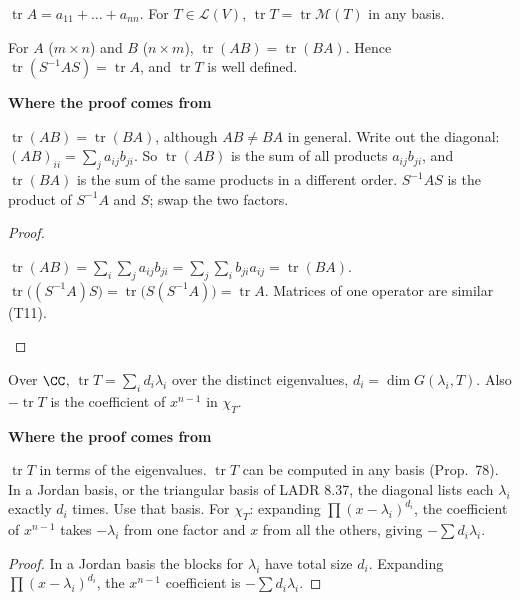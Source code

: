 \documentclass[10pt]{scrartcl}
\DeclareMathOperator{\tr}{tr}
\newcommand{\LL}{\mathcal L}
\newcommand{\MM}{\mathcal M}
\newenvironment{motive}{\begin{mdframed}[style=thinkbox]\textbf{\color{OliveGreen!75!black}Where the proof comes from}\begin{description}[leftmargin=0.9em,labelindent=0pt,itemsep=2pt,topsep=2pt,font=\normalfont\bfseries\color{OliveGreen!70!black}]}{\end{description}\end{mdframed}}
\newenvironment{steps}{\begin{enumerate}[label=\arabic*.,leftmargin=1.5em,itemsep=2pt,topsep=2pt]}{\end{enumerate}}
\begin{document}
\begin{definition*}
  $\tr A=a_{11}+\dots+a_{nn}$. For $T\in\LL(V)$, $\tr T=\tr\MM(T)$ in any basis.
\end{definition*}

\begin{proposition*}
  For $A$ ($m\times n$) and $B$ ($n\times m$), $\tr(AB)=\tr(BA)$. Hence $\tr(S^{-1}AS)=\tr A$, and $\tr T$ is well defined.
\end{proposition*}
\begin{motive}
  \ii[Want.] $\tr(AB)=\tr(BA)$, although $AB\ne BA$ in general.
   Write out the diagonal: $(AB)_{ii}=\sum_ja_{ij}b_{ji}$. So $\tr(AB)$ is the sum of all products $a_{ij}b_{ji}$, and $\tr(BA)$ is the sum of the same products in a different order.
  \ii[Similarity.] $S^{-1}AS$ is the product of $S^{-1}A$ and $S$; swap the two factors.
\end{motive}
\begin{proof}
  \begin{steps}
    \ii $\tr(AB)=\sum_i\sum_ja_{ij}b_{ji}=\sum_j\sum_ib_{ji}a_{ij}=\tr(BA)$.
    \ii $\tr\big((S^{-1}A)S\big)=\tr\big(S(S^{-1}A)\big)=\tr A$. Matrices of one operator are similar (T11).
  \end{steps}
\end{proof}

\begin{proposition*}
  Over $\CC$, $\tr T=\sum_id_i\lambda_i$ over the distinct eigenvalues, $d_i=\dim G(\lambda_i,T)$. Also $-\tr T$ is the coefficient of $x^{n-1}$ in $\chi_T$.
\end{proposition*}
\begin{motive}
  \ii[Want.] $\tr T$ in terms of the eigenvalues.
  \ii[Know.] $\tr T$ can be computed in any basis (Prop.~78). In a Jordan basis, or the triangular basis of LADR 8.37, the diagonal lists each $\lambda_i$ exactly $d_i$ times.
   Use that basis. For $\chi_T$: expanding $\prod(x-\lambda_i)^{d_i}$, the coefficient of $x^{n-1}$ takes $-\lambda_i$ from one factor and $x$ from all the others, giving $-\sum d_i\lambda_i$.
\end{motive}
\begin{proof}
  In a Jordan basis the blocks for $\lambda_i$ have total size $d_i$. Expanding $\prod(x-\lambda_i)^{d_i}$, the $x^{n-1}$ coefficient is $-\sum d_i\lambda_i$.
\end{proof}
\end{document}
